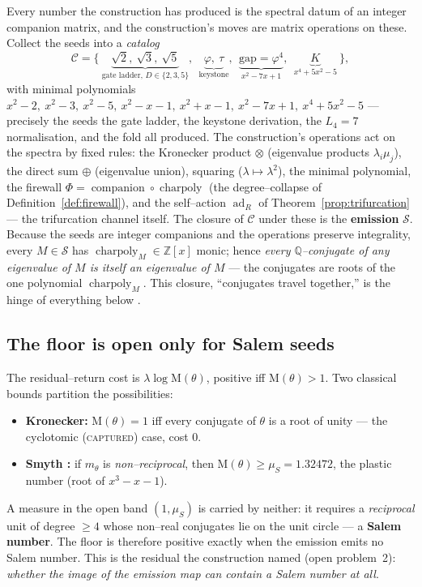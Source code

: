 \documentclass[11pt]{article}
\theoremstyle{plain}
\theoremstyle{definition}
\theoremstyle{remark}
\newcommand{\Q}{\mathbb{Q}}
\newcommand{\Z}{\mathbb{Z}}
\newcommand{\Mah}{\mathrm{M}}
\newcommand{\Ccal}{\mathcal{C}}
\newcommand{\Scal}{\mathcal{S}}
\begin{document}
Every number the construction has produced is the spectral datum of an integer companion matrix, and the construction's moves are matrix operations on these. Collect the seeds into a \emph{catalog}
\[
\Ccal=\bigl\{\ \underbrace{\sqrt2,\ \sqrt3,\ \sqrt5}_{\text{gate ladder, }D\in\{2,3,5\}},\ \ \underbrace{\varphi,\ \tau}_{\text{keystone}},\ \ \underbrace{\mathrm{gap}=\varphi^4}_{x^2-7x+1},\ \ \underbrace{K}_{x^4+5x^2-5}\ \bigr\},
\]
with minimal polynomials $x^2-2,\ x^2-3,\ x^2-5,\ x^2-x-1,\ x^2+x-1,\ x^2-7x+1,\ x^4+5x^2-5$ --- precisely the seeds the gate ladder, the keystone derivation, the $L_4=7$ normalisation, and the fold all produced. The construction's operations act on the spectra by fixed rules: the Kronecker product $\otimes$ (eigenvalue products $\lambda_i\mu_j$), the direct sum $\oplus$ (eigenvalue union), squaring ($\lambda\mapsto\lambda^2$), the minimal polynomial, the firewall $\Phi=\operatorname{companion}\circ\operatorname{charpoly}$ (the degree--collapse of Definition~\ref{def:firewall}), and the self--action $\operatorname{ad}_R$ of Theorem~\ref{prop:trifurcation} --- the trifurcation channel itself. The closure of $\Ccal$ under these is the \textbf{emission} $\Scal$. Because the seeds are integer companions and the operations preserve integrality, every $M\in\Scal$ has $\operatorname{charpoly}_M\in\Z[x]$ monic; hence \emph{every $\Q$--conjugate of any eigenvalue of $M$ is itself an eigenvalue of $M$} --- the conjugates are roots of the one polynomial $\operatorname{charpoly}_M$. This closure, ``conjugates travel together,'' is the hinge of everything below \cite[\S2]{EG}.

\subsection{The floor is open only for Salem seeds}\label{ssec:onlysalem}

The residual--return cost is $\lambda\log\Mah(\theta)$, positive iff $\Mah(\theta)>1$. Two classical bounds partition the possibilities:
\begin{itemize}[leftmargin=1.4em,topsep=2pt,itemsep=1pt]
\item \textbf{Kronecker:} $\Mah(\theta)=1$ iff every conjugate of $\theta$ is a root of unity --- the cyclotomic (\textsc{captured}) case, cost $0$.
\item \textbf{Smyth \cite{Smyth}:} if $m_\theta$ is \emph{non--reciprocal}, then $\Mah(\theta)\ge\mu_S=1.32472$, the plastic number (root of $x^3-x-1$).
\end{itemize}
A measure in the open band $(1,\mu_S)$ is carried by neither: it requires a \emph{reciprocal} unit of degree $\ge4$ whose non--real conjugates lie on the unit circle --- a \textbf{Salem number}. The floor is therefore positive exactly when the emission emits no Salem number. This is the residual the construction named (open problem~2): \emph{whether the image of the emission map can contain a Salem number at all}.
\end{document}
